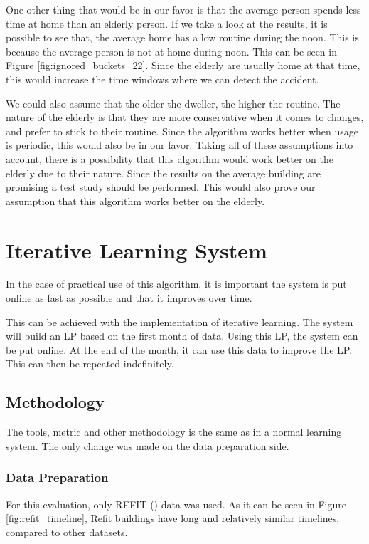One other thing that would be in our favor is that the average person spends less time at home than an elderly person. 
If we take a look at the results, it is possible to see that,
the average home has a low routine during the noon. 
This is because the average person is not at home during noon.
This can be seen in Figure \ref{fig:ignored_buckets_22}.
Since the elderly are usually home at that time, this would 
increase the time windows where we can detect the accident.

We could also assume that the older the dweller, the higher the routine. 
The nature of the elderly is that they are more conservative when it comes to changes, and prefer to stick to their routine.
Since the algorithm works better when usage is periodic, this would also be in our favor. 
Taking all of these assumptions into account, 
there is a possibility that this algorithm would work 
better on the elderly due to their nature.
Since the results on the average building are promising
a test study should be performed. 
This would also prove our assumption that this algorithm works 
better on the elderly.

\section{Iterative Learning System}

In the case of practical use of this algorithm, it is 
important the system is put online as fast as possible and that it improves over time. 

This can be achieved with the implementation of iterative learning.
The system will build an LP based on the first month of data.
Using this LP, the system can be put online.
At the end of the month, it can use this data to improve the LP.
This can then be repeated indefinitely. 
 
\subsection{Methodology}
The tools, metric and other methodology is the same as in a normal learning system.
The only change was made on the data preparation side.

\subsubsection{Data Preparation}
For this evaluation, only REFIT (\cite{REFIT}) data was used. 
As it can be seen in Figure \ref{fig:refit_timeline},
Refit buildings have long and relatively similar timelines,
compared to other datasets.

